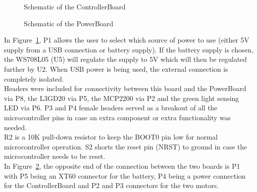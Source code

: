     \begin{figure}[H]
      \begin{center}
        \caption{Schematic of the ControllerBoard}
        \label{fig:ControllerBoardSchematic}
      \end{center}
    \end{figure}

    \begin{figure}[H]
      \begin{center}
        \caption{Schematic of the PowerBoard}
        \label{fig:PowerBoardSchematic}
      \end{center}
    \end{figure}

    In Figure~\ref{fig:ControllerBoardSchematic}, P1 allows the user to select which source of power to use (either 5V supply from a USB connection or battery supply). If the battery supply is chosen, the WS708L05 (U5) will regulate the supply to 5V which will then be regulated further by U2. When USB power is being used, the external connection is completely isolated.\\

    Headers were included for connectivity between this board and the PowerBoard via P8, the L3GD20 via P5, the MCP2200 via P2 and the green light sensing LED via P6. P3 and P4 female headers served as a breakout of all the microcontroller pins in case an extra component or extra functionality was needed.\\

    R2 is a 10K pull-down resistor to keep the BOOT0 pin low for normal microcontroller operation. S2 shorts the reset pin (NRST) to ground in case the microcontroller needs to be reset.\\

    In Figure~\ref{fig:PowerBoardSchematic}, the opposite end of the connection between the two boards is P1 with P5 being an XT60 connector for the battery, P4 being a power connection for the ControllerBoard and P2 and P3 connectors for the two motors.

